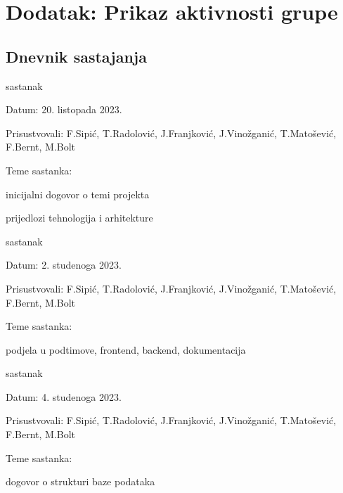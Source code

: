 \chapter*{Dodatak: Prikaz aktivnosti grupe}
		
		\section*{Dnevnik sastajanja}
		
		
		\begin{packed_enum}
			\item  sastanak
			
			\item[] \begin{packed_item}
				\item Datum: 20. listopada 2023.
				\item Prisustvovali: F.Sipić, T.Radolović, J.Franjković, J.Vinožganić, T.Matošević, F.Bernt, M.Bolt
				\item Teme sastanka:
				\begin{packed_item}
					\item  inicijalni dogovor o temi projekta
					\item  prijedlozi tehnologija i arhitekture
				\end{packed_item}
			\end{packed_item}
			
			\item  sastanak
			\item[] \begin{packed_item}
				\item Datum: 2. studenoga 2023.
				\item Prisustvovali: F.Sipić, T.Radolović, J.Franjković, J.Vinožganić, T.Matošević, F.Bernt, M.Bolt
				\item Teme sastanka:
				\begin{packed_item}
					\item  podjela u podtimove, frontend, backend, dokumentacija
				\end{packed_item}
			\end{packed_item}

			\item  sastanak
			\item[] \begin{packed_item}
				\item Datum: 4. studenoga 2023.
				\item Prisustvovali: F.Sipić, T.Radolović, J.Franjković, J.Vinožganić, T.Matošević, F.Bernt, M.Bolt
				\item Teme sastanka:
				\begin{packed_item}
					\item  dogovor o strukturi baze podataka
				\end{packed_item}
			\end{packed_item}


\end{packed_enum}
